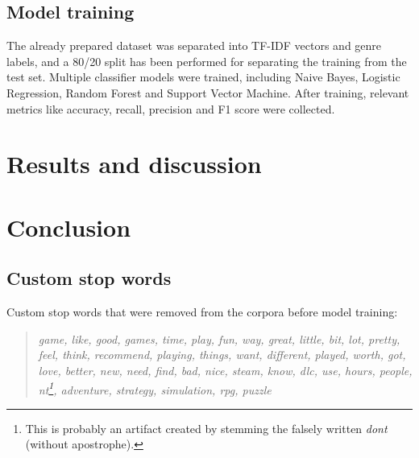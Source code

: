 \documentclass[11pt, a4paper]{article}
\newenvironment{itquote}
  {\begin{quote}\itshape}
  {\end{quote}\ignorespacesafterend}
\begin{document}
\subsection{Model training}\label{subsec:model-training}
The already prepared dataset was separated into TF-IDF vectors and genre labels, and a 80/20 split has been performed
for separating the training from the test set.
Multiple classifier models were trained, including Naive Bayes, Logistic Regression, Random Forest and Support Vector
Machine.
After training, relevant metrics like accuracy, recall, precision and F1 score were collected.




\section{Results and discussion}\label{sec:results-and-discussion}








\section{Conclusion}\label{sec:conclusion}


\clearpage

\nocite{*}
\printbibliography

\clearpage

\begin{appendices}
\section{Custom stop words}\label{sec:stops}
Custom stop words that were removed from the corpora before model training:
\begin{itquote}
    game, like, good, games, time, play, fun, way, great, little, bit, lot, pretty, feel, think, recommend, playing,
    things, want, different, played, worth, got, love, better, new, need, find, bad, nice, steam, know, dlc, use, hours,
    people, nt\footnote{This is probably an artifact created by stemming the falsely written \textit{dont} (without
    apostrophe).}, adventure, strategy, simulation, rpg, puzzle
\end{itquote}
\end{appendices}
\end{document}
